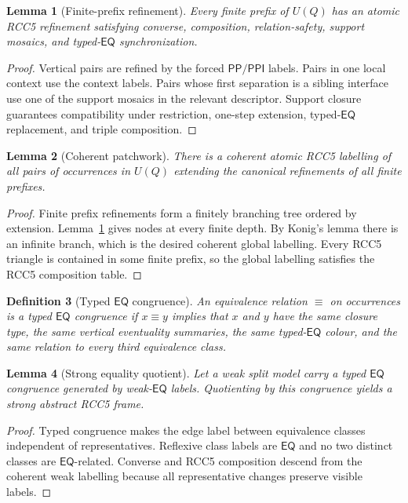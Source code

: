 \documentclass[11pt]{article}
\newtheorem{definition}{Definition}[section]
\newtheorem{lemma}[definition]{Lemma}
\theoremstyle{remark}
\newcommand{\PP}{\mathsf{PP}}
\newcommand{\PPI}{\mathsf{PPI}}
\newcommand{\EQ}{\mathsf{EQ}}
\begin{document}
\begin{lemma}[Finite-prefix refinement]\label{lem:prefix-refinement}
Every finite prefix of $U(Q)$ has an atomic RCC5 refinement satisfying converse, composition, relation-safety, support mosaics, and typed-$\EQ$ synchronization.
\end{lemma}
\begin{proof}
Vertical pairs are refined by the forced $\PP/\PPI$ labels.  Pairs in one local context use the context labels.  Pairs whose first separation is a sibling interface use one of the support mosaics in the relevant descriptor.  Support closure guarantees compatibility under restriction, one-step extension, typed-$\EQ$ replacement, and triple composition.
\end{proof}

\begin{lemma}[Coherent patchwork]\label{lem:patchwork}
There is a coherent atomic RCC5 labelling of all pairs of occurrences in $U(Q)$ extending the canonical refinements of all finite prefixes.
\end{lemma}
\begin{proof}
Finite prefix refinements form a finitely branching tree ordered by extension.  Lemma~\ref{lem:prefix-refinement} gives nodes at every finite depth.  By Konig's lemma there is an infinite branch, which is the desired coherent global labelling.  Every RCC5 triangle is contained in some finite prefix, so the global labelling satisfies the RCC5 composition table.
\end{proof}

\begin{definition}[Typed $\EQ$ congruence]
An equivalence relation $\equiv$ on occurrences is a typed $\EQ$ congruence if $x\equiv y$ implies that $x$ and $y$ have the same closure type, the same vertical eventuality summaries, the same typed-$\EQ$ colour, and the same relation to every third equivalence class.
\end{definition}

\begin{lemma}[Strong equality quotient]\label{lem:eq-quotient}
Let a weak split model carry a typed $\EQ$ congruence generated by weak-$\EQ$ labels.  Quotienting by this congruence yields a strong abstract RCC5 frame.
\end{lemma}
\begin{proof}
Typed congruence makes the edge label between equivalence classes independent of representatives.  Reflexive class labels are $\EQ$ and no two distinct classes are $\EQ$-related.  Converse and RCC5 composition descend from the coherent weak labelling because all representative changes preserve visible labels.
\end{proof}
\end{document}
